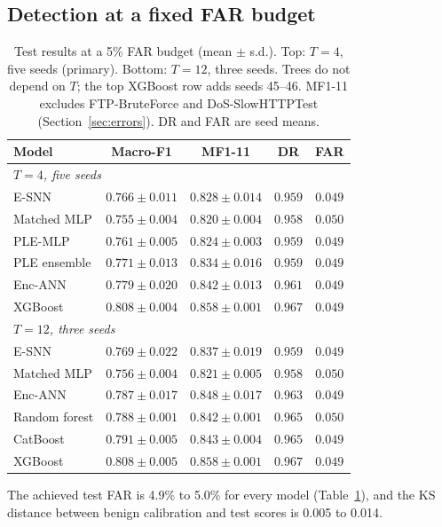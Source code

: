 \documentclass[conference]{IEEEtran}
\begin{document}
\subsection{Detection at a fixed FAR budget}

\begin{table}[t]
\centering
\caption{Test results at a 5\% FAR budget (mean $\pm$ s.d.). Top: $T = 4$, five seeds (primary). Bottom: $T = 12$, three seeds. Trees do not depend on $T$; the top XGBoost row adds seeds 45--46. MF1-11 excludes FTP-BruteForce and DoS-SlowHTTPTest (Section~\ref{sec:errors}). DR and FAR are seed means.}
\label{tab:main}
\setlength{\tabcolsep}{2.5pt}
\begin{tabular}{lcccc}
\toprule
Model & Macro-F1 & MF1-11 & DR & FAR \\
\midrule
\multicolumn{5}{l}{\emph{$T = 4$, five seeds}} \\
E-SNN & $0.766 \pm 0.011$ & $0.828 \pm 0.014$ & $0.959$ & $0.049$ \\
Matched MLP & $0.755 \pm 0.004$ & $0.820 \pm 0.004$ & $0.958$ & $0.050$ \\
PLE-MLP & $0.761 \pm 0.005$ & $0.824 \pm 0.003$ & $0.959$ & $0.049$ \\
PLE ensemble & $0.771 \pm 0.013$ & $0.834 \pm 0.016$ & $0.959$ & $0.049$ \\
Enc-ANN & $0.779 \pm 0.020$ & $0.842 \pm 0.013$ & $0.961$ & $0.049$ \\
XGBoost & $0.808 \pm 0.004$ & $0.858 \pm 0.001$ & $0.967$ & $0.049$ \\
\midrule
\multicolumn{5}{l}{\emph{$T = 12$, three seeds}} \\
E-SNN & $0.769 \pm 0.022$ & $0.837 \pm 0.019$ & $0.959$ & $0.049$ \\
Matched MLP & $0.756 \pm 0.004$ & $0.821 \pm 0.005$ & $0.958$ & $0.050$ \\
Enc-ANN & $0.787 \pm 0.017$ & $0.848 \pm 0.017$ & $0.963$ & $0.049$ \\
Random forest & $0.788 \pm 0.001$ & $0.842 \pm 0.001$ & $0.965$ & $0.050$ \\
CatBoost & $0.791 \pm 0.005$ & $0.843 \pm 0.004$ & $0.965$ & $0.049$ \\
XGBoost & $0.808 \pm 0.005$ & $0.858 \pm 0.001$ & $0.967$ & $0.049$ \\
\bottomrule
\end{tabular}
\end{table}

The achieved test FAR is 4.9\% to 5.0\% for every model (Table~\ref{tab:main}), and the KS distance between benign calibration and test scores is 0.005 to 0.014.
\end{document}
